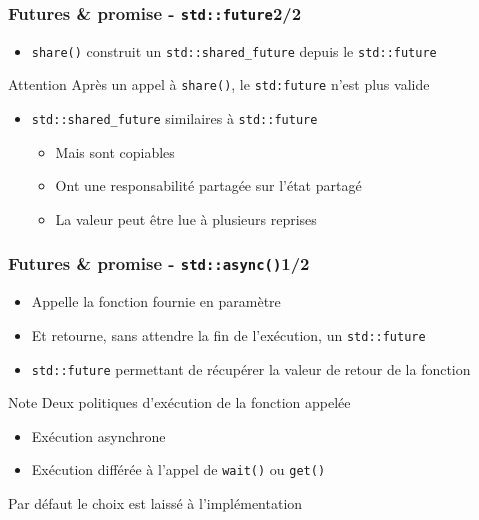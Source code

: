 \documentclass[C++.tex]{subfiles}
\begin{document}
\begin{frame}[fragile]
	\frametitle{Futures \& promise - \lstinline|std::future|\titlehfill{}2/2}
	\begin{itemize}
		\item \lstinline|share()| construit un \lstinline|std::shared_future| depuis le \lstinline|std::future|
	\end{itemize}

	\begin{alertblock}{Attention}
		Après un appel à \lstinline|share()|, le \lstinline|std:future| n'est plus valide
	\end{alertblock}

	\begin{itemize}
		\item \lstinline|std::shared_future| similaires à \lstinline|std::future|
		\begin{itemize}
			\item Mais sont copiables
			\item Ont une responsabilité partagée sur l'état partagé
			\item La valeur peut être lue à plusieurs reprises
		\end{itemize}
	\end{itemize}
\end{frame}

\begin{frame}[fragile]
	\frametitle{Futures \& promise - \lstinline|std::async()|\titlehfill{}1/2}
	\begin{itemize}
		\item Appelle la fonction fournie en paramètre
		\item Et retourne, sans attendre la fin de l'exécution, un \lstinline|std::future|
		\item \lstinline|std::future| permettant de récupérer la valeur de retour de la fonction
	\end{itemize}

	\begin{block}{Note}
		Deux politiques d'exécution de la fonction appelée
		\begin{itemize}
			\item Exécution asynchrone
			\item Exécution différée à l'appel de \lstinline|wait()| ou \lstinline|get()|
		\end{itemize}
		Par défaut le choix est laissé à l'implémentation
	\end{block}
\end{frame}
\end{document}
